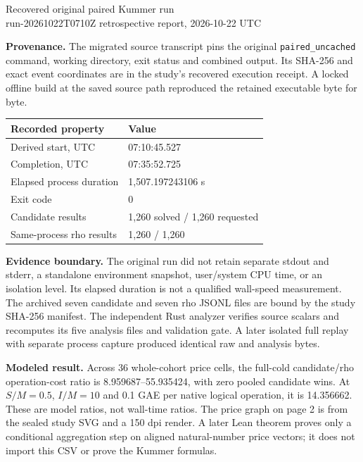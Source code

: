 \documentclass[10pt,a4paper]{article}
\begin{document}
\begin{center}
{\Large Recovered original paired Kummer run}\\[3pt]
{\small run-20261022T0710Z \quad retrospective report, 2026-10-22 UTC}
\end{center}

\textbf{Provenance.} The migrated source transcript pins the original
\texttt{paired\_uncached} command, working directory, exit status and combined
output. Its SHA-256 and exact event coordinates are in the study's recovered
execution receipt. A locked offline build
at the saved source path reproduced the retained executable byte for byte.

\begin{center}
\begin{tabular}{ll}
\toprule
Recorded property & Value \\
\midrule
Derived start, UTC & 07:10:45.527 \\
Completion, UTC & 07:35:52.725 \\
Elapsed process duration & 1,507.197243106 s \\
Exit code & 0 \\
Candidate results & 1,260 solved / 1,260 requested \\
Same-process rho results & 1,260 / 1,260 \\
\bottomrule
\end{tabular}
\end{center}

\textbf{Evidence boundary.} The original run did not retain separate stdout
and stderr, a standalone environment snapshot, user/system CPU time, or an
isolation level. Its elapsed duration is not a qualified wall-speed
measurement. The archived seven candidate and seven rho JSONL files are
bound by the study SHA-256 manifest. The independent Rust analyzer verifies
source scalars and recomputes its five analysis files and validation gate.
A later isolated full replay with separate process capture produced identical
raw and analysis bytes.

\textbf{Modeled result.} Across 36 whole-cohort price cells, the full-cold
candidate/rho operation-cost ratio is 8.959687--55.935424, with zero pooled
candidate wins. At $S/M=0.5$, $I/M=10$ and 0.1 GAE per native logical
operation, it is 14.356662. These are model ratios, not wall-time ratios.
The price graph on page 2 is from the sealed study SVG and a 150 dpi render.
A later Lean theorem proves only a conditional aggregation step on aligned
natural-number price vectors; it does not import this CSV or prove the
Kummer formulas.
\end{document}
